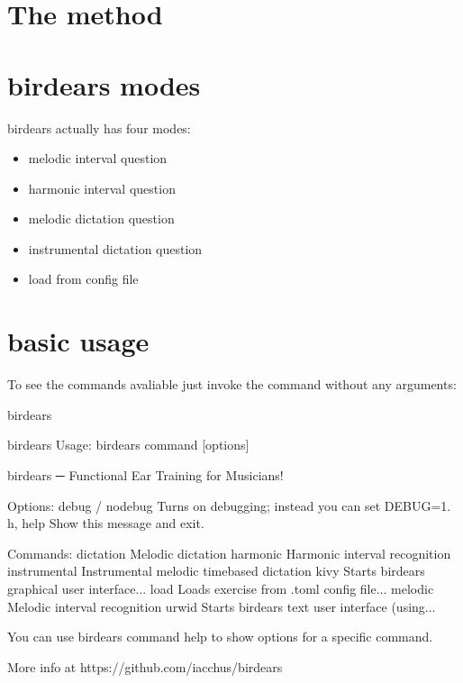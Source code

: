 \documentclass[letterpaper,10pt,english]{sphinxmanual}
\begin{document}
\section{The method}
\label{\detokenize{index:the-method}}

\section{birdears modes}
\label{\detokenize{index:birdears-modes}}
birdears actually has four modes:
\begin{itemize}
\item {} 
melodic interval question

\item {} 
harmonic interval question

\item {} 
melodic dictation question

\item {} 
instrumental dictation question

\item {} 
load from config file

\end{itemize}


\section{basic usage}
\label{\detokenize{index:basic-usage}}
To see the commands avaliable just invoke the command without any arguments:

\begin{sphinxVerbatim}[commandchars=\\\{\}]
birdears
\end{sphinxVerbatim}

\begin{sphinxVerbatim}[commandchars=\\\{\}]
\PYGZdl{} birdears
Usage: birdears  \PYGZlt{}command\PYGZgt{} [options]

birdears ─ Functional Ear Training for Musicians!

Options:
  \PYGZhy{}\PYGZhy{}debug / \PYGZhy{}\PYGZhy{}no\PYGZhy{}debug  Turns on debugging; instead you can set DEBUG=1.
  \PYGZhy{}h, \PYGZhy{}\PYGZhy{}help            Show this message and exit.

Commands:
  dictation     Melodic dictation
  harmonic      Harmonic interval recognition
  instrumental  Instrumental melodic time\PYGZhy{}based dictation
  kivy          Starts birdears graphical user interface...
  load          Loads exercise from .toml config file...
  melodic       Melodic interval recognition
  urwid         Starts birdears text user interface (using...

  You can use \PYGZsq{}birdears \PYGZlt{}command\PYGZgt{} \PYGZhy{}\PYGZhy{}help\PYGZsq{} to show options for a specific
  command.

  More info at https://github.com/iacchus/birdears
\end{sphinxVerbatim}
\end{document}
